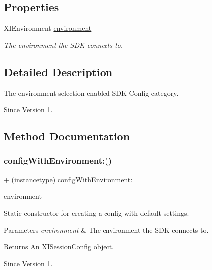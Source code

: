 \subsection*{Properties}
\begin{DoxyCompactItemize}
\item 
X\+I\+Environment \hyperlink{category_x_i_sdk_config_07_selector_08_acf4a6e964bf34ed131bd9b3a2324a186}{environment}
\begin{DoxyCompactList}\small\item\em The environment the S\+DK connects to. \end{DoxyCompactList}\end{DoxyCompactItemize}


\subsection{Detailed Description}
The environment selection enabled S\+DK Config category. 

\begin{DoxySince}{Since}
Version 1. 
\end{DoxySince}


\subsection{Method Documentation}
\hypertarget{category_x_i_sdk_config_07_selector_08_afa1234314350e4363b3540809540812b}{}\label{category_x_i_sdk_config_07_selector_08_afa1234314350e4363b3540809540812b} 
\subsubsection{\texorpdfstring{config\+With\+Environment\+:()}{configWithEnvironment:()}}
{\footnotesize\ttfamily + (instancetype) config\+With\+Environment\+: \begin{DoxyParamCaption}\item[{(X\+I\+Environment)}]{environment }\end{DoxyParamCaption}}



Static constructor for creating a config with default settings. 


\begin{DoxyParams}{Parameters}
{\em environment} & The environment the S\+DK connects to. \\
\hline
\end{DoxyParams}
\begin{DoxyReturn}{Returns}
An X\+I\+Session\+Config object. 
\end{DoxyReturn}
\begin{DoxySince}{Since}
Version 1. 
\end{DoxySince}


